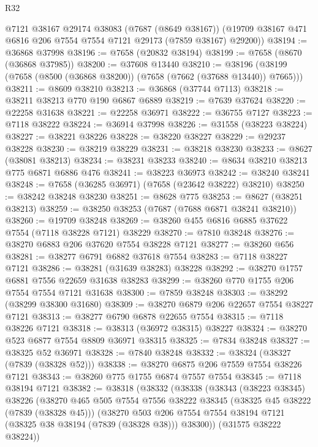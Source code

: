 \begin{lexlean}{R32}
\begin{coremodule}
      @7121
      @38167
      @29174
      @38083
      (@7687 (@8649 @38167))
      (@19709 @38167 @471 @6816 @206 @7554 @7554 @7121 @29173 (@7859 @38167) @29200))
@38194 := @36868 @37998
@38196 := @7658 (@20832 @38194)
@38199 := @7658 (@8670 (@36868 @37985))
@38200 := @37608 @13440
@38210 := @38196 (@38199 (@7658 (@8500 (@36868 @38200)) (@7658 (@7662 (@37688 @13440)) @7665)))
@38211 := @8609 @38210
@38213 := @36868 (@37744 @7113)
@38218 := @38211 @38213 @770 @190 @6867 @6889
@38219 := @7639 @37624
@38220 := @22258 @31638
@38221 := @22258 @36971
@38222 := @36755 @7127
@38223 := @7118 @38222
@38224 := @36914 @37998
@38226 := @31558 (@38223 @38224)
@38227 := @38221 @38226
@38228 := @38220 @38227
@38229 := @29237 @38228
@38230 := @38219 @38229
@38231 := @38218 @38230
@38233 := @8627 (@38081 @38213)
@38234 := @38231 @38233
@38240 := @8634 @38210 @38213 @775 @6871 @6886 @476
@38241 := @38223 @36973
@38242 := @38240 @38241
@38248 := @7658 (@36285 @36971) (@7658 (@23642 @38222) @38210)
@38250 := @38242 @38248 @38230
@38251 := @8628 @775
@38253 := @8627 (@38251 @38213)
@38259 := @38250 @38253 (@7687 (@7688 @6871 @38241 @38210))
@38260 := @19709 @38248
@38269 := @38260 @455 @6816 @6885 @37622 @7554 (@7118 @38228 @7121) @38229
@38270 := @7810 @38248
@38276 := @38270 @6883 @206 @37620 @7554 @38228 @7121
@38277 := @38260 @656
@38281 := @38277 @6791 @6882 @37618 @7554
@38283 := @7118 @38227 @7121
@38286 := @38281 (@31639 @38283) @38228
@38292 := @38270 @1757 @6881 @7556 @22659 @31638 @38283
@38299 := @38260 @770 @1755 @206 @7554 @7554 @7121 @31638
@38300 := @7859 @38248
@38303 := @38292 (@38299 @38300 @31680)
@38309 := @38270 @6879 @206 @22657 @7554 @38227 @7121
@38313 := @38277 @6790 @6878 @22655 @7554
@38315 := @7118 @38226 @7121
@38318 := @38313 (@36972 @38315) @38227
@38324 := @38270 @523 @6877 @7554 @8809 @36971 @38315
@38325 := @7834 @38248
@38327 := @38325 @52 @36971
@38328 := @7840 @38248
@38332 := @38324 (@38327 (@7839 (@38328 @52)))
@38338 := @38270 @6875 @206 @7559 @7554 @38226 @7121
@38343 := @38260 @775 @1755 @6874 @7557 @7554
@38345 := @7118 @38194 @7121
@38382 := @38318
    (@38332
      (@38338
        (@38343
          (@38223 @38345)
          @38226
          (@38270
            @465
            @505
            @7554
            @7556
            @38222
            @38345
            (@38325 @45 @38222 (@7839 (@38328 @45)))
            (@38270
              @503
              @206
              @7554
              @7554
              @38194
              @7121
              (@38325 @38 @38194 (@7839 (@38328 @38)))
              @38300))
          (@31575 @38222 @38224))

\end{coremodule}
\end{lexlean}
